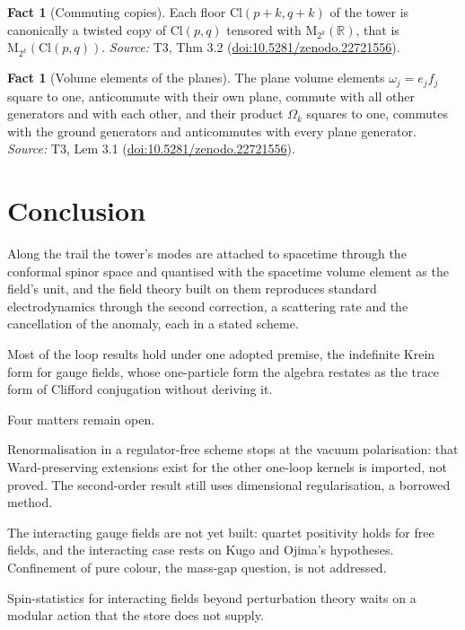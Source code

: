 \documentclass[11pt]{article}
\theoremstyle{definition}
\newtheorem{fact}[theorem]{Fact}
\theoremstyle{plain}
\providecommand{\Cl}{}\renewcommand{\Cl}{\mathrm{Cl}}
\providecommand{\Mat}{}\renewcommand{\Mat}{\mathrm{M}}
\providecommand{\R}{}\renewcommand{\R}{\mathbb{R}}
\begin{document}
\begin{fact}[Commuting copies]\label{c:tower.commuting-copies}
Each floor $\Cl(p{+}k, q{+}k)$ of the tower is canonically a twisted copy of $\Cl(p,q)$ tensored with $\Mat_{2^k}(\R)$, that is $\Mat_{2^k}(\Cl(p,q))$.
\emph{Source:} T3, Thm 3.2 (\href{https://doi.org/10.5281/zenodo.22721556}{doi:10.5281/zenodo.22721556}).
\end{fact}

\begin{fact}[Volume elements of the planes]\label{c:tower.volume-elements-planes}
The plane volume elements $\omega_j = e_j f_j$ square to one, anticommute with their own plane, commute with all other generators and with each other, and their product $\Omega_k$ squares to one, commutes with the ground generators and anticommutes with every plane generator.
\emph{Source:} T3, Lem 3.1 (\href{https://doi.org/10.5281/zenodo.22721556}{doi:10.5281/zenodo.22721556}).
\end{fact}

\section*{Conclusion}
Along the trail the tower's modes are attached to spacetime through the conformal spinor space and quantised with the spacetime volume element as the field's unit, and the field theory built on them reproduces standard electrodynamics through the second correction, a scattering rate and the cancellation of the anomaly, each in a stated scheme.

Most of the loop results hold under one adopted premise, the indefinite Krein form for gauge fields, whose one-particle form the algebra restates as the trace form of Clifford conjugation without deriving it.

Four matters remain open.

Renormalisation in a regulator-free scheme stops at the vacuum polarisation: that Ward-preserving extensions exist for the other one-loop kernels is imported, not proved. The second-order result still uses dimensional regularisation, a borrowed method.

The interacting gauge fields are not yet built: quartet positivity holds for free fields, and the interacting case rests on Kugo and Ojima's hypotheses. Confinement of pure colour, the mass-gap question, is not addressed.

Spin-statistics for interacting fields beyond perturbation theory waits on a modular action that the store does not supply.
\end{document}
